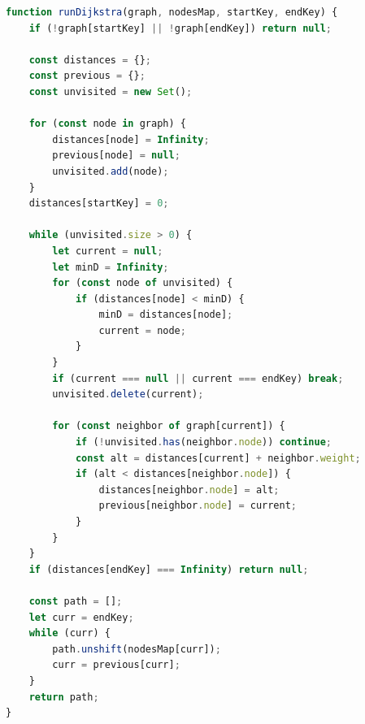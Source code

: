 \begin{lstlisting}[language=JavaScript, caption={Algoritmul lui Dijkstra (routing.js)}, label={lst:b3}]
function runDijkstra(graph, nodesMap, startKey, endKey) {
    if (!graph[startKey] || !graph[endKey]) return null;

    const distances = {};
    const previous = {};
    const unvisited = new Set();

    for (const node in graph) {
        distances[node] = Infinity;
        previous[node] = null;
        unvisited.add(node);
    }
    distances[startKey] = 0;

    while (unvisited.size > 0) {
        let current = null;
        let minD = Infinity;
        for (const node of unvisited) {
            if (distances[node] < minD) {
                minD = distances[node];
                current = node;
            }
        }
        if (current === null || current === endKey) break;
        unvisited.delete(current);

        for (const neighbor of graph[current]) {
            if (!unvisited.has(neighbor.node)) continue;
            const alt = distances[current] + neighbor.weight;
            if (alt < distances[neighbor.node]) {
                distances[neighbor.node] = alt;
                previous[neighbor.node] = current;
            }
        }
    }
    if (distances[endKey] === Infinity) return null; 

    const path = [];
    let curr = endKey;
    while (curr) {
        path.unshift(nodesMap[curr]);
        curr = previous[curr];
    }
    return path;
}
\end{lstlisting}

